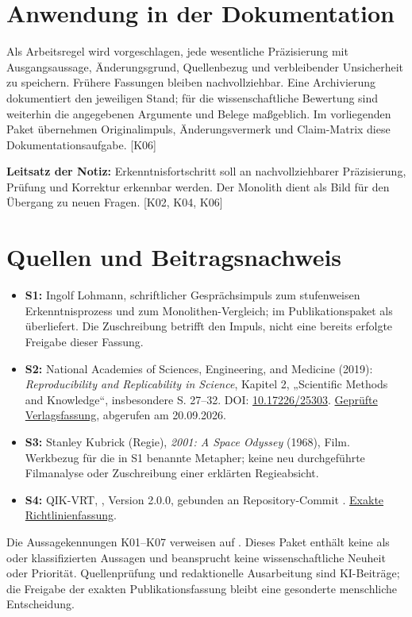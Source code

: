 \documentclass[11pt,a4paper]{article}
\begin{document}
\section*{Anwendung in der Dokumentation}

Als Arbeitsregel wird vorgeschlagen, jede wesentliche Präzisierung mit Ausgangsaussage, Änderungsgrund, Quellenbezug und verbleibender Unsicherheit zu speichern. Frühere Fassungen bleiben nachvollziehbar. Eine Archivierung dokumentiert den jeweiligen Stand; für die wissenschaftliche Bewertung sind weiterhin die angegebenen Argumente und Belege maßgeblich. Im vorliegenden Paket übernehmen Originalimpuls, Änderungsvermerk und Claim-Matrix diese Dokumentationsaufgabe. [K06]

\textbf{Leitsatz der Notiz:} Erkenntnisfortschritt soll an nachvollziehbarer Präzisierung, Prüfung und Korrektur erkennbar werden. Der Monolith dient als Bild für den Übergang zu neuen Fragen. [K02, K04, K06]

\section*{Quellen und Beitragsnachweis}

\begin{itemize}
\item \textbf{S1:} Ingolf Lohmann, schriftlicher Gesprächsimpuls zum stufenweisen Erkenntnisprozess und zum Monolithen-Vergleich; im Publikationspaket als  überliefert. Die Zuschreibung betrifft den Impuls, nicht eine bereits erfolgte Freigabe dieser Fassung.
\item \textbf{S2:} National Academies of Sciences, Engineering, and Medicine (2019): \emph{Reproducibility and Replicability in Science}, Kapitel 2, „Scientific Methods and Knowledge“, insbesondere S. 27–32. DOI: \href{https://doi.org/10.17226/25303}{10.17226/25303}. \href{https://www.nationalacademies.org/read/25303/chapter/5}{Geprüfte Verlagsfassung}, abgerufen am 20.09.2026.
\item \textbf{S3:} Stanley Kubrick (Regie), \emph{2001: A Space Odyssey} (1968), Film. Werkbezug für die in S1 benannte Metapher; keine neu durchgeführte Filmanalyse oder Zuschreibung einer erklärten Regieabsicht.
\item \textbf{S4:} QIK-VRT, , Version 2.0.0, gebunden an Repository-Commit . \href{https://github.com/Goldkelch/qik-vrt/blob/a86054139b49c13c5cd344753b248b46b5daf66f/policy/zenodo-machine-proof-policy-v2.json}{Exakte Richtlinienfassung}.
\end{itemize}

Die Aussagekennungen K01–K07 verweisen auf . Dieses Paket enthält keine als  oder  klassifizierten Aussagen und beansprucht keine wissenschaftliche Neuheit oder Priorität. Quellenprüfung und redaktionelle Ausarbeitung sind KI-Beiträge; die Freigabe der exakten Publikationsfassung bleibt eine gesonderte menschliche Entscheidung.
\end{document}
